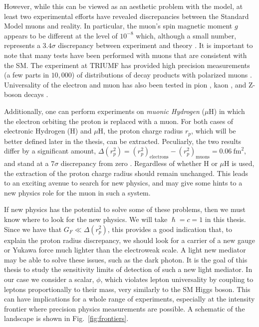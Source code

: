 However, while this can be viewed as an aesthetic problem with the model, at least two experimental efforts have revealed discrepancies between the Standard Model muons and reality.
In particular, the muon's spin magnetic moment $g$ appears to be different at the level of $10^{-8}$ which, although a small number, represents a $3.4\sigma$ discrepancy between experiment and theory \cite{2007PhLB..649..173H}.
It is important to note that many tests have been performed with muons that are consistent with the SM.
The \twist experiment at TRIUMF has provided high precision measurements (a few parts in $10,000$) of distributions of decay products with polarized muons \cite{Bayes:2011zza}.
Universality of the electron and muon has also been tested in pion \cite{Czapek:1993kc}, kaon \cite{Antonelli:2008jg}, and Z-boson decays \cite{Alexander:1991qw}.

Additionally, one can perform experiments on \emph{muonic Hydrogen} ($\mu\textrm{H}$) in which the electron orbiting the proton is replaced with a muon.
For both cases of electronic Hydrogen (H) and $\mu\textrm{H}$, the proton charge radius $r_p$, which will be better defined later in the thesis, can be extracted.
Peculiarly, the two results differ by a significant amount, $\Delta(r_p^2) = (r_p^2)_{\textrm{electrons}} - (r_p^2)_{\textrm{muons}} = 0.06~\textrm{fm}^2$, and stand at a $7\sigma$ discrepancy from zero \cite{Carlson:2015jba}.
Regardless of whether H or $\mu\textrm{H}$ is used, the extraction of the proton charge radius should remain unchanged.
This leads to an exciting avenue to search for new physics, and may give some hints to a new physics role for the muon in such a system.

If new physics has the potential to solve some of these problems, then we must know where to look for the new physics.
We will take $\hslash = c = 1$ in this thesis.
Since we have that $G_F \ll \Delta(r_p^2)$, this provides a good indication that, to explain the proton radius discrepancy, we should look for a carrier of a new gauge or Yukawa force much lighter than the electroweak scale.
A light new mediator may be able to solve these issues, such as the dark photon.
It is the goal of this thesis to study the sensitivity limits of detection of such a new light mediator.
In our case we consider a scalar, $\phi$, which violates lepton universality by coupling to leptons proportionally to their mass, very similarly to the SM Higgs boson.
This can have implications for a whole range of experiments, especially at the intensity frontier where precision physics measurements are possible.
A schematic of the landscape is shown in Fig.\ \ref{fig:frontiers}.

